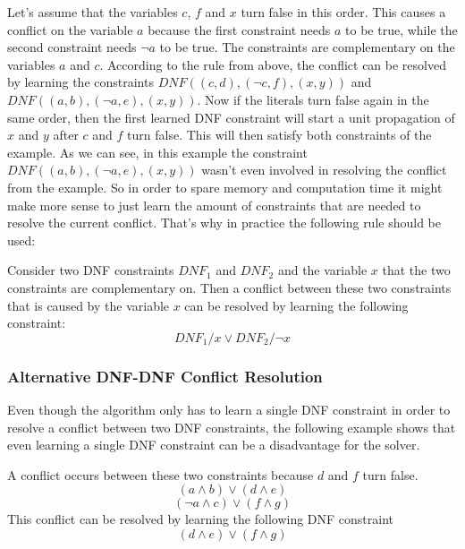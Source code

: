 \documentclass{easychair}
\begin{document}
Let's assume that the variables $c$, $f$ and $x$ turn false in this order. This causes a conflict on the variable $a$ because the first constraint needs $a$ to be true, while the second constraint needs $\neg a$ to be true. The constraints are complementary on the variables $a$ and $c$. According to the rule from above, the conflict can be resolved by learning the constraints $DNF((c,d),(\neg c, f),(x,y))$ and $DNF((a,b),(\neg a, e),(x,y))$. Now if the literals turn false again in the same order, then the first learned DNF constraint will start a unit propagation of $x$ and $y$ after $c$ and $f$ turn false. This will then satisfy both constraints of the example. As we can see, in this example the constraint $DNF((a,b),(\neg a, e),(x,y))$ wasn't even involved in resolving the conflict from the example. So in order to spare memory and computation time it might make more sense to just learn the amount of constraints that are needed to resolve the current conflict. That's why in practice the following rule should be used:

Consider two DNF constraints $DNF_1$ and $DNF_2$ and the variable $x$ that the two constraints are complementary on. Then a conflict between these two constraints that is caused by the variable $x$ can be resolved by learning the following constraint:
\begin{displaymath}
DNF_1 / x \vee DNF_2 / \neg x
\end{displaymath}

\subsubsection{Alternative DNF-DNF Conflict Resolution}

Even though the algorithm only has to learn a single DNF constraint in order to resolve a conflict between two DNF constraints, the following example shows that even learning a single DNF constraint can be a disadvantage for the solver.

A conflict occurs between these two constraints because $d$ and $f$ turn false.
\begin{displaymath}
(a \wedge b) \vee (d \wedge e)
\end{displaymath}
\begin{displaymath}
(\neg a \wedge c) \vee (f \wedge g)
\end{displaymath}
This conflict can be resolved by learning the following DNF constraint
\begin{displaymath}
(d \wedge e) \vee (f \wedge g)
\end{displaymath}
\end{document}
